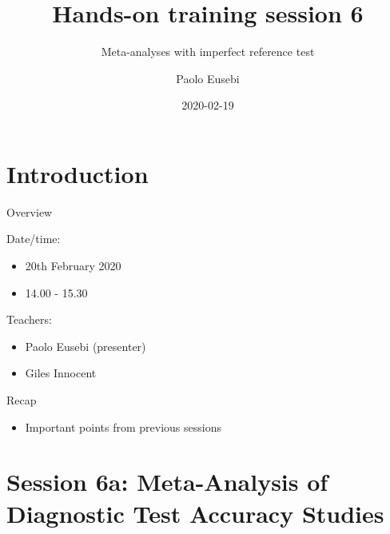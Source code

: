 \documentclass[
  ignorenonframetext,
  aspectratio=43,
]{beamer}
\title{Hands-on training session 6}
\subtitle{Meta-analyses with imperfect reference test}
\author{Paolo Eusebi}
\date{2020-02-19}
\providecommand{\tightlist}{%
  \setlength{\itemsep}{0pt}\setlength{\parskip}{0pt}}
\begin{document}
\frame{\titlepage}

\hypertarget{introduction}{%
\section{Introduction}\label{introduction}}

\begin{frame}{Overview}
\protect\hypertarget{overview}{}

Date/time:

\begin{itemize}
\tightlist
\item
  20th February 2020
\item
  14.00 - 15.30
\end{itemize}

Teachers:

\begin{itemize}
\tightlist
\item
  Paolo Eusebi (presenter)
\item
  Giles Innocent
\end{itemize}

\end{frame}

\begin{frame}{Recap}
\protect\hypertarget{recap}{}

\begin{itemize}
\tightlist
\item
  Important points from previous sessions
\end{itemize}

\end{frame}

\hypertarget{session-6a-meta-analysis-of-diagnostic-test-accuracy-studies}{%
\section{Session 6a: Meta-Analysis of Diagnostic Test Accuracy
Studies}\label{session-6a-meta-analysis-of-diagnostic-test-accuracy-studies}}
\end{document}
